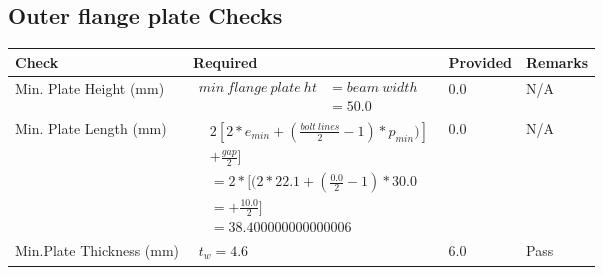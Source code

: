 \documentclass{article}%
\begin{document}
\subsection{Outer flange plate Checks}%
\label{subsec:OuterflangeplateChecks}%
\renewcommand{\arraystretch}{1.2}%
\begin{longtable}{|p{4cm}|p{6cm}|p{5.5cm}|p{1.5cm}|}%
\hline%
\rowcolor{OsdagGreen}%
Check&Required&Provided&Remarks\\%
\hline%
\endhead%
\hline%
Min. Plate Height (mm)&$\begin{aligned}min~flange~plate~ht &= beam~width\\ &=50.0\end{aligned}$&0.0&N/A\\%
\hline%
Min. Plate Length (mm)&$\begin{aligned} & 2[2*e_{min} + ({\frac{bolt~lines}{2}}-1) * p_{min})]\\ & +\frac{gap}{2}]\\ &=2*[(2*22.1 + (\frac{0.0}{2}-1) * 30.0\\ &= + \frac{10.0}{2}]\\ &=38.400000000000006\end{aligned}$&0.0&N/A\\%
\hline%
Min.Plate Thickness (mm)&$\begin{aligned} t_w=4.6\end{aligned}$&6.0&Pass\\%
\hline%
\end{longtable}

%
\end{document}
